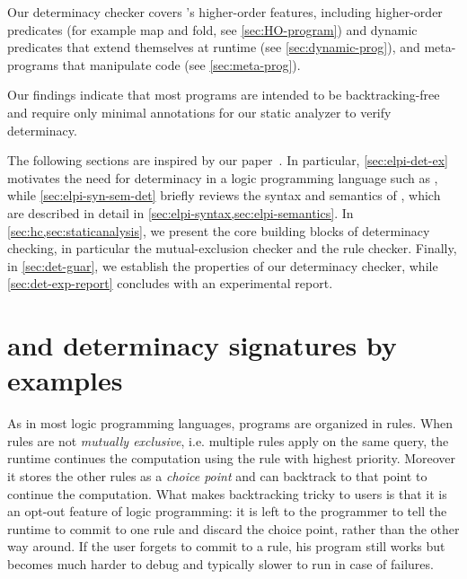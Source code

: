 Our determinacy checker covers \elpi's
higher-order features, including higher-order predicates (for
example map and fold, see \cref{sec:HO-program}) and dynamic predicates that extend themselves at
runtime (see \cref{sec:dynamic-prog}), and meta-programs that manipulate \elpi code
(see \cref{sec:meta-prog}).

Our findings indicate that most \elpi programs are intended to be
backtracking-free and require only minimal annotations for our static
analyzer to verify determinacy.

The following sections are inspired by our paper~\cite{fissore2026}.
In particular, \cref{sec:elpi-det-ex} motivates the need for determinacy
in a logic programming language such as \elpi, while
\cref{sec:elpi-syn-sem-det} briefly reviews the syntax and semantics of
\elpi, which are described in detail in
\cref{sec:elpi-syntax,sec:elpi-semantics}. In
\cref{sec:hc,sec:staticanalysis}, we present the core building blocks of
determinacy checking, in particular the mutual-exclusion checker and the
rule checker. Finally, in \cref{sec:det-guar}, we establish the
properties of our determinacy checker, while
\cref{sec:det-exp-report} concludes with an experimental report.


\section{\elpi and determinacy signatures by examples}\label{sec:intro}
\label{sec:elpi-det-ex}

As in most logic programming languages, \elpi programs are organized in rules.
When rules are not \emph{mutually exclusive}, i.e. multiple rules apply on the same query,
the runtime continues the computation 
using the rule with highest priority. Moreover it stores the 
other rules as a \emph{choice point} and
can backtrack to that point to continue the computation.
What makes backtracking tricky to \elpi users is that it is an opt-out feature
of logic programming: it is left to the programmer to tell the
runtime to commit to one rule and discard the choice point, rather than
the other way around. If the user forgets to commit to a rule, his program
still works but becomes much harder to debug and typically slower to run
in case of failures.

